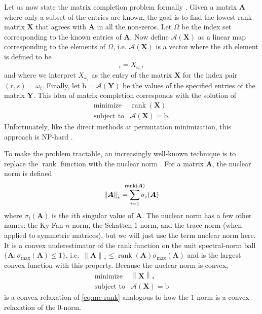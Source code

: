 \documentclass{sig-alternate}
\renewcommand{\cite}{\citep}
\newcommand{\sA}{\mathcal{A}}
\DeclareMathOperator{\rank}{rank}
\newcommand{\mat}{\boldsymbol}
\renewcommand{\vec}[1]{\boldsymbol{\mathrm{#1}}}
\providecommand{\mA}{\ensuremath{\mat{A}}}
\providecommand{\mX}{\ensuremath{\mat{X}}}
\providecommand{\mY}{\ensuremath{\mat{Y}}}
\providecommand{\vb}{\ensuremath{\vec{b}}}
\DeclareMathOperator*{\minimize}{minimize}
\DeclareMathOperator{\subjectto}{subject\ to}
\providecommand{\MINof}[1][]{{\displaystyle \minimize_{#1}}}
\providecommand{\MINone}[3]{\begin{array}{ll} \MINof[#1] & #2 \\ \subjectto  & #3 \end{array}}
\newcommand{\sstretchsym}[3]{\ensuremath{\left#1 #3 \right#2}}
\newcommand{\nstretchsym}[3]{\ensuremath{#1 #3 #2}}
\newcommand{\normof}[2][]{\sstretchsym{\|}{\|}{#2}_{#1}}
\newcommand{\nnormof}[2][]{\nstretchsym{\|}{\|}{#2}_{#1}}
\def\clap#1{\hbox to 0pt{\hss#1\hss}}
\def\mathclap{\mathpalette\mathclapinternal}
\def\mathclapinternal#1#2{\clap{$\mathsurround=0pt#1{#2}$}}
\begin{document}
Let us now state the matrix completion problem formally
\cite{candes2009-exact-completion,recht2009-nuclear-norm}.
Given a matrix $\mA$ where only a subset of the entries
are known, the goal is to find the 
lowest rank matrix $\mX$ that agrees with $\mA$ in all
the non-zeros.  
Let $\Omega$ be the index set corresponding
to the known entries of $\mA$.
Now define $\sA(\mX)$ as a linear map corresponding to the
elements of $\Omega$, i.e. $\sA(\mX)$ is a vector where
the $i$th element is defined to be
\begin{equation}
[\sA(\mX)]_i = X_{\omega_i},
\end{equation}
and where we interpret $X_{\omega_i}$ as the entry of the 
matrix $\mX$ for the index pair $(r,s) = \omega_i$.
Finally, let $\vb = \sA(\mY)$ be the values of the specified 
entries of the matrix $\mY$.  
This idea of matrix completion corresponds with the
solution of 
\begin{equation} \label{eq:mc-rank}
\MINone{}{\rank(\mX)}{\sA(\mX) = \vb.}
\end{equation}
Unfortunately, like the direct
methods at permutation minimization, this approach 
is NP-hard \cite{vandenberghe1996-semidefinite}.

To make the problem tractable, an increasingly well-known technique is
to replace the $\rank$ function with the nuclear norm
 \cite{fazel2002-phdthesis}.
For a matrix $\mA$, the nuclear norm is defined 
\begin{equation}
\normof[*]{\mA} = \sum_{i=1}^{\mathclap{\rank(\mA)}} \sigma_i(\mA)
\end{equation}
where $\sigma_i(\mA)$ is the $i$th singular value of
$\mA$.
The nuclear norm has a few other names:
the Ky-Fan $n$-norm, the Schatten $1$-norm,
and the trace norm (when applied to symmetric matrices),
but we will just use the term nuclear norm here.
It is a convex underestimator of the
rank function on the unit spectral-norm ball $\{ \mA : \sigma_{\max}(\mA) \le 1 \}$, i.e.\ $\nnormof[*]{\mA} \le \rank(\mA) \sigma_{\max}(\mA)$
and is the largest convex function with this property.
Because the nuclear norm is convex,
\begin{equation} \label{eq:mc-nn}
\MINone{}{\normof[*]{\mX}}{\sA(\mX) = \vb}
\end{equation}
is a convex relaxation of \eqref{eq:mc-rank}
analogous to how the $1$-norm is a convex
relaxation of the $0$-norm.  
\end{document}
